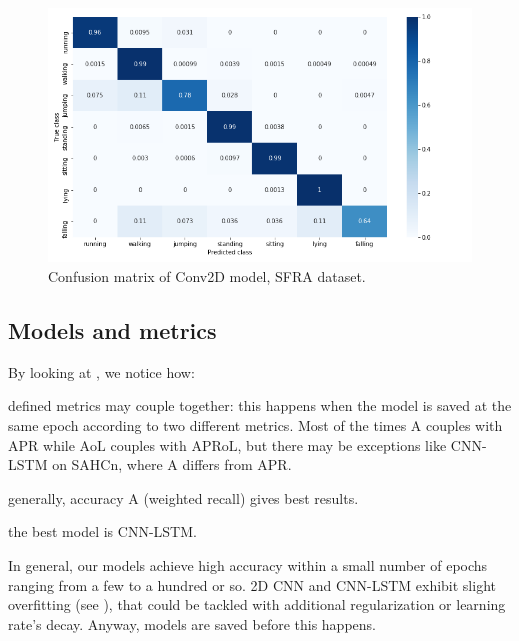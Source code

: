\begin{figure}[ht]
\hspace*{+0.15cm}
    \centering
    \includegraphics[width=1.05\columnwidth]{images/plot-cm-SNOR_Conv2D.png}
    \caption{Confusion matrix of Conv2D model, SFRA dataset.}%
    \label{fig:cm-snor-conv2d}
\end{figure}

\subsection{Models and metrics}

By looking at , we notice how:
\begin{itemize}
\begin{samepage}
    \item defined metrics may couple together: this happens when the model is saved at the same epoch according to two different metrics. Most of the times $\mathrm{A}$ couples with $\mathrm{APR}$ while $\mathrm{AoL}$ couples with $\mathrm{APRoL}$, but there may be exceptions like CNN-LSTM on SAHCn, where $\mathrm{A}$ differs from $\mathrm{APR}$.
    \item generally, accuracy $\mathrm{A}$ (weighted recall) gives best results.
    \item the best model is CNN-LSTM.
\end{samepage}
\end{itemize}

In general, our models achieve high accuracy within a small number of epochs ranging from a few to a hundred or so.
2D CNN and CNN-LSTM exhibit slight overfitting (see ), that could be tackled with additional regularization or learning rate's decay.
Anyway, models are saved before this happens.

